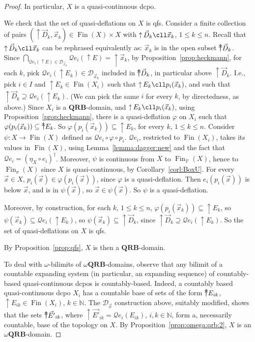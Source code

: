 \documentclass{LMCS}
\newcommand\nat{\mathbb{N}}
\newcommand\Smyth{\mathcal Q}
\newcommand\V{{\mathcal V}}
\newcommand\upc{\mathop{\uparrow}\nolimits}
\newcommand\uuarrow{\rlap{$\uparrow$}\raise.5ex\hbox{$\uparrow$}}\newcommand\ddarrow{\rlap{$\downarrow$}\raise.5ex\hbox{$\downarrow$}}\newcommand\Fin{\mathop{\text{Fin}}}
\newcommand\QRB{\mathbf{QRB}}
\begin{document}
\begin{proof}
  In particular, $X$ is a quasi-continuous dcpo.


  We check that the set of quasi-deflations on $X$ is qfs.  Consider a
  finite collection of pairs $(\upc \vec D_k, \vec x_k) \in \Fin (X)
  \times X$ with $\upc \vec D_k \cll \vec x_k$, $1\leq k\leq n$.
  Recall that $\upc \vec D_k \cll \vec x_k$ can be rephrased
  equivalently as: $\vec x_k$ is in the open subset $\uuarrow \vec
  D_k$.
Since $\bigcap_{\Smyth e_i (\upc E) \in \mathcal D_{\vec x_k}}
  \Smyth e_i (\upc E) = \upc \vec x_k$, by
  Proposition~\ref{prop:heckmann}, for each $k$, pick $\Smyth e_i
  (\upc E_k) \in \mathcal D_{\vec x_k}$ included in $\uuarrow \vec
  D_k$, in particular above $\upc \vec D_k$.  I.e., pick $i \in I$ and
  $\upc E_k \in \Fin (X_i)$ such that $\upc E_k \cll p_i (\vec x_k)$,
  and such that $\upc \vec D_k \supseteq \Smyth e_i (\upc E_k)$.
(We can pick the same $i$ for every $k$, by directedness, as above.)
  Since $X_i$ is a $\QRB$-domain, and $\upc E_k \cll p_i (\vec x_k)$,
  using Proposition~\ref{prop:heckmann}, there is a quasi-deflation
  $\varphi$ on $X_i$ such that $\varphi (p_i (\vec x_k)) \subseteq
  \uuarrow E_k$.  So $\varphi (p_i (\vec x_k)) \subseteq \upc E_k$,
  for every $k$, $1\leq k\leq n$.  Consider $\psi : X \to \Fin (X)$
  defined as $\Smyth e_i \circ \varphi \circ p_i$.  $\Smyth e_i$,
  restricted to $\Fin (X_i)$, takes its values in $\Fin (X)$, using
  Lemma~\ref{lemma:dagger:new} and the fact that $\Smyth e_i =
  {(\eta_X \circ e_i)}^\dagger$.  Moreover, $\psi$ is continuous from
  $X$ to $\Fin_\V (X)$, hence to $\Fin_\sigma (X)$ since $X$ is
  quasi-continuous, by Corollary~\ref{corl:BoxU}.  For every $\vec x
  \in X$, $p_i (\vec x) \in \varphi (p_i (\vec x))$, since $\varphi$
  is a quasi-deflation.  Then $e_i (p_i (\vec x))$ is below $\vec x$,
  and is in $\psi (\vec x)$, so $\vec x \in \psi (\vec x)$.  So $\psi$
  is a quasi-deflation.

  Moreover, by construction, for each $k$, $1\leq k\leq n$, $\varphi
  (p_i (\vec x_k)) \subseteq \upc E_k$, so $\psi (\vec x_k) \subseteq
  \Smyth e_i (\upc E_k)$, so $\psi (\vec x_k) \subseteq \upc \vec
  D_k$, since $\upc \vec D_k \supseteq \Smyth e_i (\upc E_k)$.  So the set
  of quasi-deflations on $X$ is qfs.

  By Proposition~\ref{prop:qfs}, $X$ is then a $\QRB$-domain.

  To deal with $\omega$-bilimits of $\omega\QRB$-domains, observe that
  any bilimit of a countable expanding system (in particular, an
  expanding sequence) of countably-based quasi-continuous dcpos is
  countably-based.  Indeed, a countably based quasi-continuous dcpo
  $X_i$ has a countable base of sets of the form $\uuarrow E_{ik}$,
  $\upc E_{ik} \in \Fin (X_i)$, $k \in \nat$.  The $\mathcal D_{\vec
    x}$ construction above, suitably modified, shows that the sets
  $\uuarrow \vec {E'}_{ik}$, where $\upc \vec {E'}_{ik} = \Smyth e_i
  (E_{ik})$, $i, k \in \nat$, form a, necessarily countable, base of
  the topology on $X$.  By Proposition~\ref{prop:omega:qrb:2}, $X$ is
  an $\omega\QRB$-domain.
\end{proof}
\end{document}
